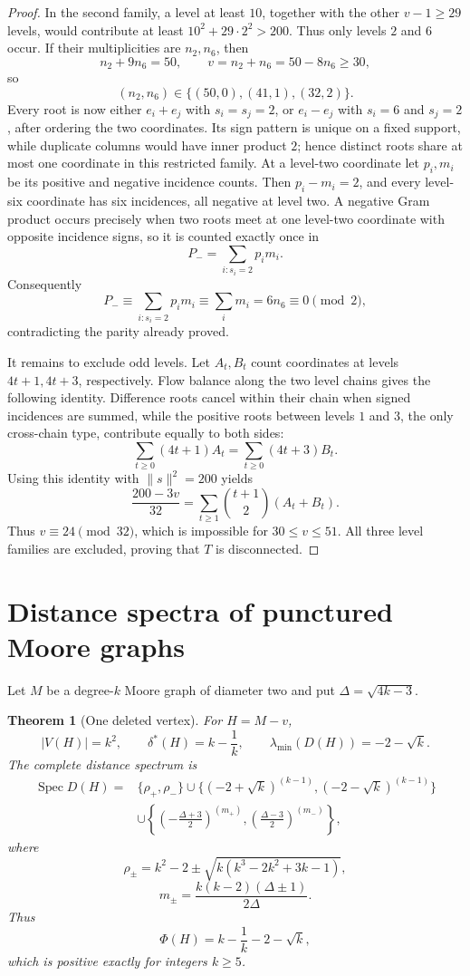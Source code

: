 \documentclass[a4paper,10pt,reqno]{amsart}
\theoremstyle{plain}
\newtheorem{theorem}{Theorem}[section]
\theoremstyle{definition}
\theoremstyle{remark}
\newcommand{\Spec}{\operatorname{Spec}}
\begin{document}
\begin{proof}
In the second family, a level at least \(10\), together with the other
\(v-1\ge29\) levels, would contribute at least
\(10^2+29\cdot2^2>200\).  Thus only levels \(2\) and \(6\) occur.  If their
multiplicities are \(n_2,n_6\), then
\[
n_2+9n_6=50,\qquad
v=n_2+n_6=50-8n_6\ge30,
\]
so
\[
(n_2,n_6)\in\{(50,0),(41,1),(32,2)\}.
\]
Every root is now either \(e_i+e_j\) with \(s_i=s_j=2\), or
\(e_i-e_j\) with \(s_i=6\) and \(s_j=2\), after ordering the two coordinates.
Its sign pattern is unique on a fixed support, while duplicate columns would
have inner product \(2\); hence distinct roots share at most one coordinate
in this restricted family.  At a level-two coordinate let \(p_i,m_i\) be its
positive and negative incidence counts.  Then \(p_i-m_i=2\), and every
level-six coordinate has six incidences, all negative at level two.  A
negative Gram product occurs precisely when two roots meet at one level-two
coordinate with opposite incidence signs, so it is counted exactly once in
\[
P_-=\sum_{i:s_i=2}p_im_i.
\]
Consequently
\[
P_-\equiv\sum_{i:s_i=2} p_im_i
\equiv\sum_i m_i
=6n_6
\equiv0\pmod2,
\]
contradicting the parity already proved.

It remains to exclude odd levels.  Let \(A_t,B_t\) count coordinates at
levels \(4t+1,4t+3\), respectively.  Flow balance along the two level chains
gives the following identity.  Difference roots cancel within their chain
when signed incidences are summed, while the positive roots between levels
\(1\) and \(3\), the only cross-chain type, contribute equally to both sides:
\[
\sum_{t\ge0}(4t+1)A_t
=\sum_{t\ge0}(4t+3)B_t.
\]
Using this identity with \(\lVert s\rVert^2=200\) yields
\[
\frac{200-3v}{32}
=\sum_{t\ge1}\binom{t+1}{2}(A_t+B_t).
\]
Thus \(v\equiv24\pmod {32}\), which is impossible for
\(30\le v\le51\).  All three level families are excluded, proving that \(T\)
is disconnected.
\end{proof}

\section{Distance spectra of punctured Moore graphs}\label{sec:punctures}

Let \(M\) be a degree-\(k\) Moore graph of diameter two and put
\(\Delta=\sqrt{4k-3}\).

\begin{theorem}[One deleted vertex]\label{thm:one-puncture}
For \(H=M-v\),
\[
 |V(H)|=k^2,
 \qquad \delta^*(H)=k-\frac1k,
 \qquad \lambda_{\min}(D(H))=-2-\sqrt{k}.
\]
The complete distance spectrum is
\begin{align*}
\Spec D(H)={}&\{\rho_+,\rho_-\}
 \cup\{(-2+\sqrt{k})^{(k-1)},(-2-\sqrt{k})^{(k-1)}\}\\
&\cup\left\{\left(-\frac{\Delta+3}{2}\right)^{(m_+)},
\left(\frac{\Delta-3}{2}\right)^{(m_-)}\right\},
\end{align*}
where
\[
 \rho_\pm=k^2-2\pm\sqrt{k(k^3-2k^2+3k-1)},
\]
\[
 m_\pm=\frac{k(k-2)(\Delta\pm1)}{2\Delta}.
\]
Thus
\[
 \Phi(H)=k-\frac1k-2-\sqrt{k},
\]
which is positive exactly for integers \(k\ge5\).
\end{theorem}
\end{document}
